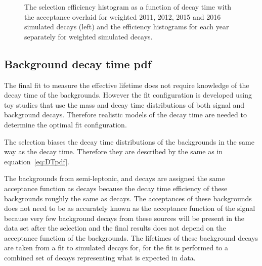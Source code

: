 {\begin{figure}[htbp]
    \caption{The selection efficiency histogram as a function of decay time with the acceptance \pdf overlaid for weighted 2011, 2012, 2015 and 2016 simulated \bsmumu decays (left) and the efficiency histograms for each year separately for weighted simulated \bsmumu decays. }
    \label{fig:accptplot}
\end{figure}


\subsection{Background decay time pdf}
\label{sec:bkgDTpdf}

The final fit to measure the \bsmumu effective lifetime does not require knowledge of the decay time \pdfs of the backgrounds. However the fit configuration is developed using toy studies that use the mass and decay time distributions of both signal and background decays. Therefore realistic models of the decay time \pdfs are needed to determine the optimal fit configuration. 


The selection biases the decay time distributions of the backgrounds in the same way as the \bsmumu decay time. Therefore they are described by the same \pdfs as in equation~\ref{eq:DTpdf}. 

The backgrounds from semi-leptonic, \bhh and \bdmumu decays are assigned the same acceptance function as \bsmumu decays because the decay time efficiency of these backgrounds roughly the same as \bsmumu decays. The acceptances of these backgrounds does not need to be as accurately known as the acceptance function of the signal because very few background decays from these sources will be present in the data set after the selection and the final results does not depend on the acceptance function of the backgrounds. The lifetimes of these background decays are taken from a fit to simulated decays for, for \bhh the fit is performed to a combined set of \bhh decays representing what is expected in data. %

}
